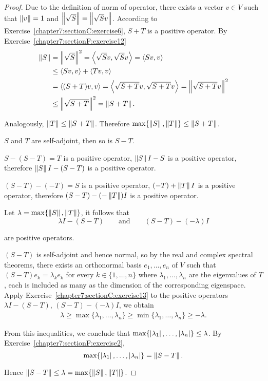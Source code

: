 \begin{proof}
    Due to the definition of norm of operator, there exists a vector $v\in V$ such that $\left\Vert{v}\right\Vert = 1$ and $\left\Vert{\sqrt{S}}\right\Vert = \left\Vert{\sqrt{S}v}\right\Vert$. According to Exercise~\ref{chapter7:sectionC:exercise6}, $S + T$ is a positive operator. By Exercise~\ref{chapter7:sectionF:exercise12}
    \begin{align*}
        \left\Vert{S}\right\Vert & = \left\Vert{\sqrt{S}}\right\Vert^{2} = \left\langle{\sqrt{S}v, \sqrt{S}v}\right\rangle = \left\langle{Sv, v}\right\rangle                    \\
                 & \leq \left\langle{Sv, v}\right\rangle + \left\langle{Tv, v}\right\rangle                                                      \\
                 & = \left\langle{(S + T)v, v}\right\rangle = \left\langle{\sqrt{S + T}v, \sqrt{S + T}v}\right\rangle = \left\Vert{\sqrt{S + T}v}\right\Vert^{2} \\
                 & \leq \left\Vert{\sqrt{S + T}}\right\Vert^{2} = \left\Vert{S + T}\right\Vert.
    \end{align*}

    Analogously, $\left\Vert{T}\right\Vert\leq \left\Vert{S + T}\right\Vert$. Therefore $\max\{ \left\Vert{S}\right\Vert, \left\Vert{T}\right\Vert \}\leq \left\Vert{S + T}\right\Vert$.

    \bigskip
    $S$ and $T$ are self-adjoint, then so is $S - T$.

    $S - (S - T) = T$ is a positive operator, $\left\Vert{S}\right\Vert I - S$ is a positive operator, therefore $\left\Vert{S}\right\Vert I - (S - T)$ is a positive operator.

    $(S - T) - (-T) = S$ is a positive operator, $(-T) + \left\Vert{T}\right\Vert I$ is a positive operator, therefore $(S - T) - (-\left\Vert{T}\right\Vert)I$ is a positive operator.

    Let $\lambda = \max\{ \left\Vert{S}\right\Vert, \left\Vert{T}\right\Vert \}$, it follows that
    \[
        \lambda I - (S - T)\qquad\text{and}\qquad (S - T) - (-\lambda)I
    \]

    are positive operators.

    $(S - T)$ is self-adjoint and hence normal, so by the real and complex spectral theorems, there exists an orthonormal basis $e_{1}, \ldots, e_{n}$ of $V$ such that $(S - T)e_{k} = \lambda_{k}e_{k}$ for every $k\in\{ 1,\ldots,n \}$ where $\lambda_{1}, \ldots, \lambda_{n}$ are the eigenvalues of $T$, each is included as many as the dimension of the corresponding eigenspace. Apply Exercise~\ref{chapter7:sectionC:exercise13} to the positive operators $\lambda I - (S - T)$, $(S - T) - (-\lambda)I$, we obtain
    \begin{align*}
        \lambda \geq \max\{ \lambda_{1}, \ldots, \lambda_{n} \} \geq \min\{ \lambda_{1}, \ldots, \lambda_{n} \} \geq -\lambda.
    \end{align*}

    From this inequalities, we conclude that $\max\{ \left\vert{\lambda_{1}}\right\vert, \ldots, \left\vert{\lambda_{n}}\right\vert \}\leq \lambda$. By Exercise~\ref{chapter7:sectionF:exercise2},
    \[
        \max\{ \left\vert{\lambda_{1}}\right\vert, \ldots, \left\vert{\lambda_{n}}\right\vert \} = \left\Vert{S - T}\right\Vert.
    \]

    Hence $\left\Vert{S - T}\right\Vert\leq \lambda = \max\{ \left\Vert{S}\right\Vert, \left\Vert{T}\right\Vert \}$.
\end{proof}
\newpage

